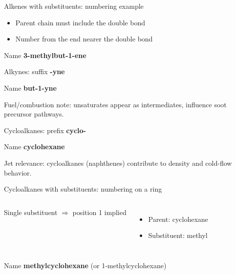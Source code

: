 \documentclass[aspectratio=169]{beamer}
\begin{document}
\begin{frame}{Alkenes with substituents: numbering example}
\centering
{}

\vspace{2mm}
\begin{itemize}
\item Parent chain must include the double bond
\item Number from the end nearer the double bond
\end{itemize}

\begin{block}{Name}
\textbf{3-methylbut-1-ene}
\end{block}
\end{frame}

\begin{frame}{Alkynes: suffix \textbf{-yne}}
\centering

\vspace{2mm}
\begin{block}{Name}
\textbf{but-1-yne}
\end{block}

Fuel/combustion note: unsaturates appear as intermediates, influence soot precursor pathways.

\end{frame}

\begin{frame}{Cycloalkanes: prefix \textbf{cyclo-}}
\centering
{} %

\vspace{2mm}
\begin{block}{Name}
\textbf{cyclohexane}
\end{block}

Jet relevance: cycloalkanes (naphthenes) contribute to density and cold-flow behavior.
\end{frame}

\begin{frame}{Cycloalkanes with substituents: numbering on a ring}
\begin{columns}[T,onlytextwidth]
\centering
{}

\vspace{1mm}
Single substituent \(\Rightarrow\) position 1 implied

\begin{itemize}
\item Parent: cyclohexane
\item Substituent: methyl
\end{itemize}
\end{columns}

\begin{block}{Name}
\textbf{methylcyclohexane} (or 1-methylcyclohexane)
\end{block}
\end{frame}
\end{document}
